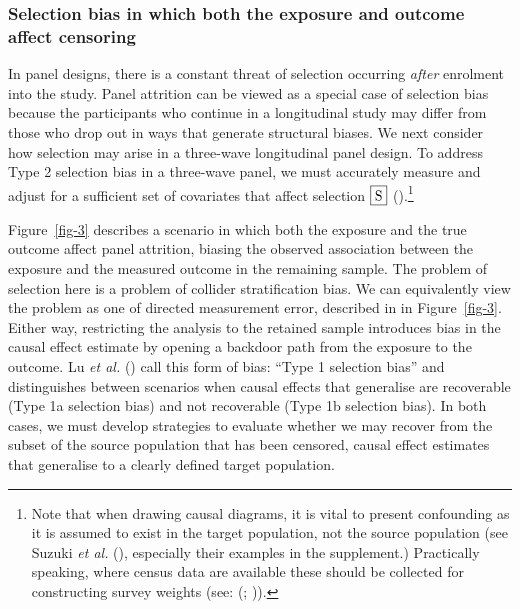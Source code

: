 \documentclass[
  singlecolumn,
  9pt]{article}
\begin{document}
\subsubsection{Selection bias in which both the exposure and outcome
affect
censoring}\label{selection-bias-in-which-both-the-exposure-and-outcome-affect-censoring}

In panel designs, there is a constant threat of selection occurring
\emph{after} enrolment into the study. Panel attrition can be viewed as
a special case of selection bias because the participants who continue
in a longitudinal study may differ from those who drop out in ways that
generate structural biases. We next consider how selection may arise in
a three-wave longitudinal panel design. To address Type 2 selection bias
in a three-wave panel, we must accurately measure and adjust for a
sufficient set of covariates that affect selection \(\framebox{S}\)
().\footnote{Note that when
  drawing causal diagrams, it is vital to present confounding as it is
  assumed to exist in the target population, not the source population
  (see Suzuki \emph{et al.} (),
  especially their examples in the supplement.) Practically speaking,
  where census data are available these should be collected for
  constructing survey weights (see: (; )).}

Figure~\ref{fig-3} describes a scenario in which both the exposure and
the true outcome affect panel attrition, biasing the observed
association between the exposure and the measured outcome in the
remaining sample. The problem of selection here is a problem of collider
stratification bias. We can equivalently view the problem as one of
directed measurement error, described in in Figure~\ref{fig-3}. Either
way, restricting the analysis to the retained sample introduces bias in
the causal effect estimate by opening a backdoor path from the exposure
to the outcome. Lu \emph{et al.} () call this
form of bias: ``Type 1 selection bias'' and distinguishes between
scenarios when causal effects that generalise are recoverable (Type 1a
selection bias) and not recoverable (Type 1b selection bias). In both
cases, we must develop strategies to evaluate whether we may recover
from the subset of the source population that has been censored, causal
effect estimates that generalise to a clearly defined target population.
\end{document}
